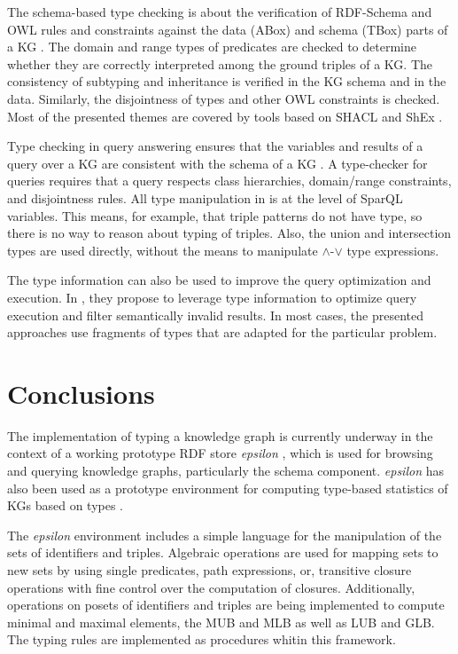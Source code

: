 \documentclass[runningheads]{llncs}
\newcommand{\epsln}{\emph{epsilon} }
\begin{document}
The schema-based type checking is about the verification of RDF-Schema
\cite{rdfschema12} and OWL \cite{owl2} rules and constraints against
the data (ABox) and schema (TBox) parts of a KG
\cite{Baader2002,Horrocks2003,OWL2Spec2012}. The domain and range
types of predicates are checked to determine whether they are correctly interpreted
among the ground triples of a KG. The consistency of subtyping and
inheritance is verified in the KG schema and in the data. Similarly,
the disjointness of types and other OWL constraints is
checked. Most of the presented themes are covered by tools based on
SHACL \cite{shacl2017} and ShEx \cite{shex2015}.

Type checking in query answering ensures that the variables and
results of a query over a KG are consistent with the schema of a KG
\cite{Zhao2017,Zhang2019}. A type-checker for queries requires that a
query respects class hierarchies, domain/range constraints, and
disjointness rules. All type manipulation in \cite{Zhao2017,Zhang2019}
is at the level of SparQL \cite{sparql} variables. This means, for
example, that triple patterns do not have type, so there is no way to
reason about typing of triples. Also, the union and intersection types
are used directly, without the means to manipulate $\land$-$\lor$ type
expressions.

The type information can also be used to improve the query
optimization and execution. In \cite{Kollia2013}, they propose to
leverage type information to optimize query execution and filter
semantically invalid results. In most cases, the presented approaches
use fragments of types that are adapted for the particular problem.





\section{Conclusions\label{sec:conclude}}

The implementation of typing a knowledge graph is currently underway
in the context of a working prototype RDF store \epsln
\cite{epsilon2025}, which is used for browsing and querying knowledge
graphs, particularly the schema component. \epsln has also been used
as a prototype environment for computing type-based statistics of KGs
based on types \cite{Savnik2025}.

The \epsln environment includes a simple language for the manipulation
of the sets of identifiers and triples. Algebraic operations are
used for mapping sets to new sets by using single predicates, path
expressions, or, transitive closure operations with fine control over
the computation of closures. Additionally, operations on posets of
identifiers and triples are being implemented to compute minimal and
maximal elements, the MUB and MLB as well as LUB and GLB. The
typing rules are implemented as procedures whitin this framework.







%



\end{document}
